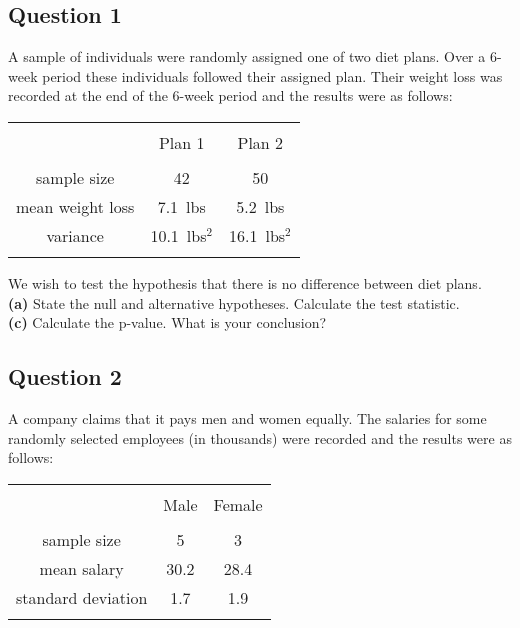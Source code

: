 \documentclass[a4paper,12pt]{article}
\begin{document}
\subsection*{Question 1}
A sample of individuals were randomly assigned one of two diet plans. Over a 6-week period these individuals followed their assigned plan. Their weight loss was recorded at the end of the 6-week period and the results were as follows: \\[-0.2cm]
\begin{center}
\begin{tabular}{|c|c|c|}
\hline
&&\\[-0.4cm]
& Plan 1 & Plan 2 \\
\hline
&&\\[-0.4cm]
sample size & 42 & 50 \\
mean weight loss & 7.1\,\,\,lbs & 5.2\,\,\,lbs \\
variance & 10.1\,\,\,lbs$^2$ & 16.1\,\,\,lbs$^2$ \\
\hline
\multicolumn{3}{c}{}\\[-0.3cm]
\end{tabular}
\end{center}

We wish to test the hypothesis that there is no difference between diet plans.\\[0.2cm]
{\bf(a)} State the null and alternative hypotheses.  Calculate the test statistic. \quad \\{\bf(c)} Calculate the p-value.  What is your conclusion?


\subsection*{Question 2}
A company claims that it pays men and women equally. The salaries for some randomly selected employees (in thousands) were recorded and the results were as follows:\\[-0.2cm]
\begin{center}
\begin{tabular}{|c|c|c|}
\hline
&&\\[-0.4cm]
& Male & Female \\
\hline
&&\\[-0.4cm]
sample size & 5 & 3 \\
mean salary & 30.2 & 28.4 \\
standard deviation & 1.7 & 1.9 \\
\hline
\multicolumn{3}{c}{}\\[-0.3cm]
\end{tabular}
\end{center}
\end{document}
